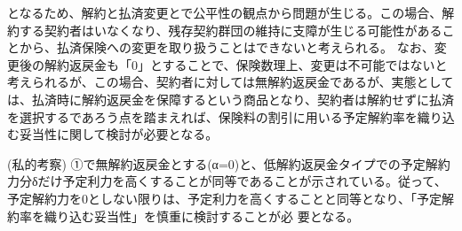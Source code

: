 \documentclass[report,gutter=10mm,fore-edge=10mm,uplatex,dvipdfmx]{jlreq}
\begin{document}
となるため、解約と払済変更とで公平性の観点から問題が生じる。この場合、解約する契約者はいなくなり、残存契約群団の維持に支障が生じる可能性があることから、払済保険への変更を取り扱うことはできないと考えられる。
なお、変更後の解約返戻金も「0」とすることで、保険数理上、変更は不可能ではないと考えられるが、この場合、契約者に対しては無解約返戻金であるが、実態としては、払済時に解約返戻金を保障するという商品となり、契約者は解約せずに払済を選択するであろう点を踏まえれば、保険料の割引に用いる予定解約率を織り込む妥当性に関して検討が必要となる。

(私的考察)
①で無解約返戻金とする(α=0)と、低解約返戻金タイプでの予定解約力分δだけ予定利力を高くすることが同等であることが示されている。従って、予定解約力を0としない限りは、予定利力を高くすることと同等となり、「予定解約率を織り込む妥当性」を慎重に検討することが必
要となる。

\end{document}
